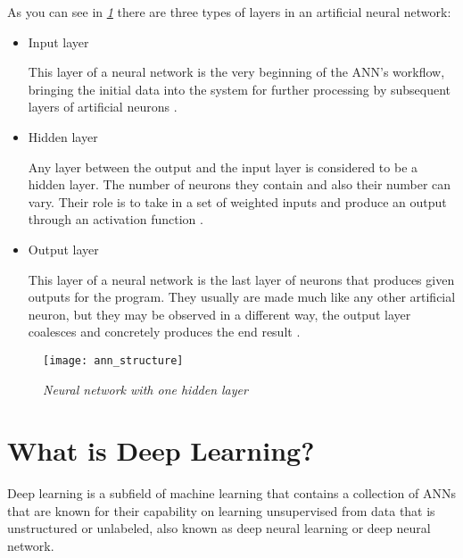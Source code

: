 As you can see in \emph{\ref{fig:ann_structure}} there are three types of layers in an artificial neural network:
\begin{itemize}[]
    \item{ Input layer
          \begin{adjustwidth}{1cm}{}
              This layer of a neural network is the very beginning of the ANN’s workflow, bringing the initial data into the system for
              further processing by subsequent layers of artificial neurons \cite{inputLayer}.
          \end{adjustwidth}
          }
    \item{ Hidden layer
          \begin{adjustwidth}{1cm}{}
              Any layer between the output and the input layer is considered to be a hidden layer.
              The number of neurons they contain and also their number can vary.
              Their role is to take in a set of weighted inputs and produce an output through an activation function \cite{hiddenlayer}.
          \end{adjustwidth}
          }
    \item{ Output layer
          \begin{adjustwidth}{1cm}{}
              This layer of a neural network is the last layer of neurons that produces given outputs for the program.
              They usually are made much like any other artificial neuron, but they may be observed in a different way,
              the output layer coalesces and concretely produces the end result \cite{outputLayer}.
          \end{adjustwidth}
          }
\end{itemize}
\begin{figure}[h]
    \centering
    \texttt{[image: ann\_structure]}
    \caption{\emph{Neural network with one hidden layer \cite{understandingANN}}}
    \label{fig:ann_structure}
\end{figure}


\section{What is Deep Learning?}

Deep learning is a subfield of machine learning that contains a collection of ANNs that are known for
their capability on learning unsupervised from data that is unstructured or unlabeled,
also known as deep neural learning or deep neural network.

